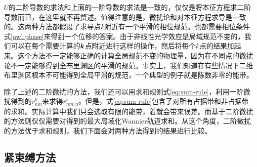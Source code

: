 $U$的二阶导数的求法和上面的一阶导数的求法是一致的，仅仅是将本征方程求二阶导数而已，在这里就不再赘述。值得注意的是，微扰论和对本征方程求导是一致的。这两种方法都假设了求导点$k$附近有一个平滑的相位规范。也都需要相位条件式\ref{owl:phase}来得到一个位移的答案。由于非线性光学效应是局域规范不变的，我们可以在每个需要计算的$\boldsymbol{k}$点附近进行这样的操作，然后将每个$k$点的结果加起来。这个方法不一定能够正确的计算全局规范不变的物理量，因为在不同点的微扰论不一定能够得到全布里渊区的平滑的规范。事实上，我们知道在有些情况下二维布里渊区根本不可能得到全局平滑的规范，一个典型的例子就是陈数非零的能带\cite{b._andrei_bernevig_topological_2013}。


除了上述的二阶微扰的方法，我们还可以用求和规则式\ref{eq:sum-rule}，利用一阶微扰得到的$r_{nm}^{b}$来求得$r_{nm;a}^{b}$。但是，式\ref{eq:sum-rule}包含了对所有占据带和非占据带的求和。实际计算中我们只会选取有限的能带，着就会带来误差。而基于二阶微扰的方法则仅仅需要对得到的最大局域化Wannier轨道求和。从这个角度，二阶微扰的方法优于求和规则，我们下面会对两种方法得到的结果进行比较。


\subsection{紧束缚方法}

